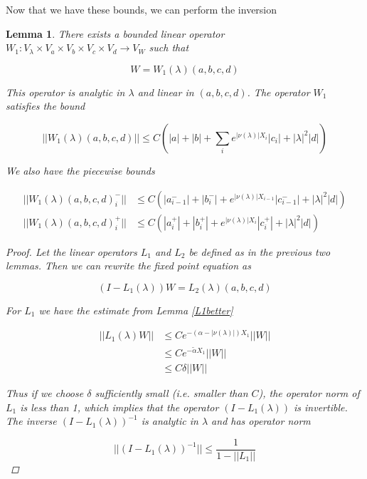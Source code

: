 \documentclass[12pt]{article}
\newtheorem{lemma}{Lemma}
\begin{document}
Now that we have these bounds, we can perform the inversion


\begin{lemma}\label{W1}
There exists a bounded linear operator $W_1: V_\lambda \times V_a \times V_b \times V_c \times V_d \rightarrow V_W$ such that 

\[
W = W_1(\lambda)(a,b,c,d)
\]

This operator is analytic in $\lambda$ and linear in $(a, b, c, d)$. The operator $W_1$ satisfies the bound

\begin{equation}\label{W1bound}
||W_1(\lambda)(a,b,c,d)|| \leq C \left( |a| + |b| + \sum_i e^{|\nu(\lambda)|X_i}|c_i| + |\lambda|^2 |d| \right)
\end{equation}

We also have the piecewise bounds

\begin{align*}
||W_1(\lambda)(a,b,c,d)_i^-|| &\leq C ( |a_{i-1}^-| + |b_i^-| + e^{|\nu(\lambda)|X_{i-1}}|c_{i-1}^-| + |\lambda|^2 |d| ) \\
||W_1(\lambda)(a,b,c,d)_i^+|| &\leq C ( |a_i^+| + |b_i^+| + e^{|\nu(\lambda)|X_i}|c_i^+| + |\lambda|^2 |d| )
\end{align*}

\begin{proof}
Let the linear operators $L_1$ and $L_2$ be defined as in the previous two lemmas. Then we can rewrite the fixed point equation as

\[
(I - L_1(\lambda))W = L_2(\lambda)(a,b,c,d)
\]

For $L_1$ we have the estimate from Lemma \ref{L1better}

\begin{align*}
||L_1(\lambda)W|| &\leq C e^{-(\alpha -|\nu(\lambda)|)X_1}||W|| \\
&\leq C e^{-\tilde{\alpha} X_1}||W|| \\
&\leq C \delta ||W||
\end{align*}

Thus if we choose $\delta$ sufficiently small (i.e. smaller than $C$), the operator norm of $L_1$ is less than 1, which implies that the operator $(I - L_1(\lambda))$ is invertible. The inverse $(I - L_1(\lambda))^{-1}$ is analytic in $\lambda$ and has operator norm 

\[
||(I - L_1(\lambda))^{-1}|| \leq \frac{1}{1 - ||L_1||}
\]


\end{proof}
\end{lemma}
\end{document}
